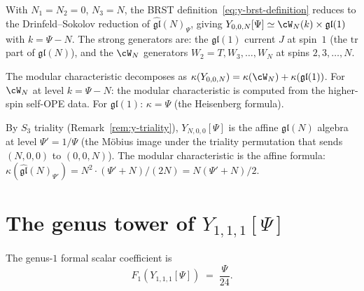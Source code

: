 \begin{computation}%
\label{comp:y-wn-specialization}
With $N_1 = N_2 = 0$, $N_3 = N$, the BRST
definition~\eqref{eq:y-brst-definition} reduces to the
Drinfeld--Sokolov reduction of
$\widehat{\mathfrak{gl}}(N)_\Psi$, giving
$Y_{0,0,N}[\Psi] \simeq \cW_N(k) \times \mathfrak{gl}(1)$
with $k = \Psi - N$. The strong generators are:
the $\mathfrak{gl}(1)$ current $J$ at spin~$1$ (the
$\mathrm{tr}$ part of $\mathfrak{gl}(N)$), and the
$\cW_N$ generators $W_2 = T, W_3, \ldots, W_N$ at spins
$2, 3, \ldots, N$.

The modular characteristic decomposes as
$\kappa(Y_{0,0,N}) = \kappa(\cW_N) + \kappa(\mathfrak{gl}(1))$.
For $\cW_N$ at level $k = \Psi - N$: the modular characteristic
is computed from the higher-spin self-OPE data. For
$\mathfrak{gl}(1)$: $\kappa = \Psi$ (the Heisenberg formula).
\end{computation}

\begin{computation}%
\label{comp:y-affine-specialization}
By $S_3$ triality (Remark~\ref{rem:y-triality}),
$Y_{N,0,0}[\Psi]$ is the affine $\mathfrak{gl}(N)$ algebra
at level $\Psi' = 1/\Psi$ \textup{(}the M\"obius image under
the triality permutation that sends $(N,0,0)$ to
$(0,0,N)$\textup{)}. The modular characteristic is the
affine formula:
$\kappa(\widehat{\mathfrak{gl}}(N)_{\Psi'})
= N^2 \cdot (\Psi' + N)/(2N)
= N(\Psi' + N)/2$.
\end{computation}


\section{The genus tower of $Y_{1,1,1}[\Psi]$}%
\label{sec:y111-genus-tower}

\begin{proposition}%
\label{prop:y111-genus1}
The genus-$1$ formal scalar coefficient is
\begin{equation}\label{eq:y111-genus1}
F_1(Y_{1,1,1}[\Psi])
\;=\; \frac{\Psi}{24}.
\end{equation}
\end{proposition}

